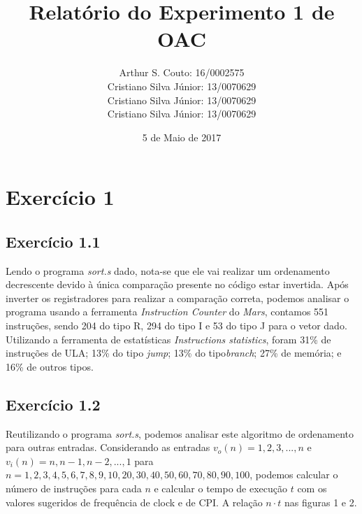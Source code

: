 \documentclass[12pt, a4paper, twoside]{article}
\begin{document}
\title{Relatório do Experimento 1 de OAC}
\author{
Arthur S. Couto: 16/0002575 \\
Cristiano Silva Júnior: 13/0070629 \\
Cristiano Silva Júnior: 13/0070629 \\
Cristiano Silva Júnior: 13/0070629}
\date{5 de Maio de 2017}
\maketitle

\section{Exercício 1}

\subsection{Exercício 1.1}

Lendo o programa \textit{sort.s} dado, nota-se que ele vai realizar um  ordenamento decrescente devido à única comparação presente no código estar  invertida. Após inverter os registradores para realizar a comparação correta, podemos analisar o programa usando a ferramenta \textit{Instruction Counter} do \textit{Mars}, contamos 551 instruções, sendo 204 do tipo R, 294 do tipo I e 53 do tipo J para o vetor dado. Utilizando a ferramenta de estatísticas \textit{Instructions statistics}, foram 31\% de instruções de ULA; 13\% do tipo \textit{jump}; 13\% do tipo\textit{branch}; 27\% de memória; e 16\% de outros tipos.

\subsection{Exercício 1.2}

Reutilizando o programa \textit{sort.s}, podemos analisar este algoritmo de ordenamento para outras entradas. Considerando as entradas $v_o(n) = {1,2,3,...,n}$ e $v_i(n)={n,n-1,n-2,...,1}$ para $n={1,2,3,4,5,6,7,8,9,10,20,30,40,50,60,70,80,90,100}$, podemos calcular o número de instruções para cada $n$ e calcular o tempo de execução $t$ com os valores sugeridos de frequência de clock e de CPI. A relação $n \cdot t$ nas figuras 1 e 2.
\end{document}

